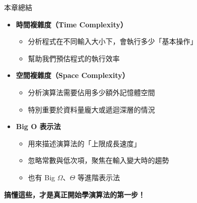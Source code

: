 \documentclass{beamer}
\begin{document}
\begin{frame}{本章總結}
\begin{itemize}
    \item \textbf{時間複雜度（Time Complexity）}
    \begin{itemize}
        \item 分析程式在不同輸入大小下，會執行多少「基本操作」
        \item 幫助我們預估程式的執行效率
    \end{itemize}
    
    \vspace{0.5em}
    \item \textbf{空間複雜度（Space Complexity）}
    \begin{itemize}
        \item 分析演算法需要佔用多少額外記憶體空間
        \item 特別重要於資料量龐大或遞迴深層的情況
    \end{itemize}

    \vspace{0.5em}
    \item \textbf{Big O 表示法}
    \begin{itemize}
        \item 用來描述演算法的「上限成長速度」
        \item 忽略常數與低次項，聚焦在輸入變大時的趨勢
        \item 也有 Big $\Omega$、$\Theta$ 等進階表示法
    \end{itemize}
\end{itemize}

\vspace{1em}
\begin{center}
    \textbf{搞懂這些，才是真正開始學演算法的第一步！}
\end{center}
\end{frame}
\end{document}

